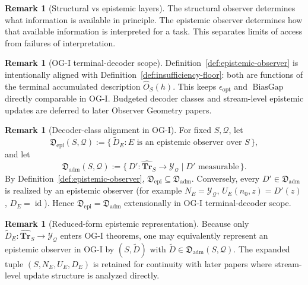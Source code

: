 \documentclass[11pt,twoside]{article}
\theoremstyle{definition}
\newtheorem{remark}[theorem]{Remark}
\newcommand{\Tr}{\mathbf{Tr}}
\DeclareMathOperator{\BiasGap}{BiasGap}
\begin{document}
\begin{remark}[Structural vs epistemic layers]
\label{rem:structural-vs-epistemic}
The structural observer determines what information is available in principle. The epistemic observer determines how that available information is interpreted for a task. This separates limits of access from failures of interpretation.
\end{remark}

\begin{remark}[OG-I terminal-decoder scope]
\label{rem:og1-terminal-decoder-scope}
Definition~\ref{def:epistemic-observer} is intentionally aligned with Definition~\ref{def:insufficiency-floor}: both are functions of the terminal accumulated description \(\widehat{O}_S(h)\). This keeps \(\epsilon_{\mathrm{opt}}\) and \(\BiasGap\) directly comparable in OG-I. Budgeted decoder classes and stream-level epistemic updates are deferred to later Observer Geometry papers.
\end{remark}

\begin{remark}[Decoder-class alignment in OG-I]
\label{rem:decoder-class-alignment}
For fixed \(S,\mathcal{Q}\), let
\[
  \mathfrak{D}_{\mathrm{epi}}(S,\mathcal{Q})
  :=
  \{\,\widetilde{D}_E : E \text{ is an epistemic observer over } S\,\},
\]
and let
\[
  \mathfrak{D}_{\mathrm{adm}}(S,\mathcal{Q})
  :=
  \{\,D' : \widehat{\Tr}_S\to\mathcal{Y}_{\mathcal{Q}} \mid D' \text{ measurable}\,\}.
\]
By Definition~\ref{def:epistemic-observer}, \(\mathfrak{D}_{\mathrm{epi}}\subseteq \mathfrak{D}_{\mathrm{adm}}\). Conversely, every \(D'\in\mathfrak{D}_{\mathrm{adm}}\) is realized by an epistemic observer (for example \(N_E=\mathcal{Y}_{\mathcal{Q}}\), \(U_E(n_0,z)=D'(z)\), \(D_E=\operatorname{id}\)). Hence \(\mathfrak{D}_{\mathrm{epi}}=\mathfrak{D}_{\mathrm{adm}}\) extensionally in OG-I terminal-decoder scope.
\end{remark}

\begin{remark}[Reduced-form epistemic representation]
\label{rem:reduced-form-epistemic}
Because only \(\widetilde{D}_E:\widehat{\Tr}_S\to\mathcal{Y}_{\mathcal{Q}}\) enters OG-I theorems, one may equivalently represent an epistemic observer in OG-I by \((S,\widetilde{D})\) with \(\widetilde{D}\in\mathfrak{D}_{\mathrm{adm}}(S,\mathcal{Q})\). The expanded tuple \((S,N_E,U_E,D_E)\) is retained for continuity with later papers where stream-level update structure is analyzed directly.
\end{remark}
\end{document}
